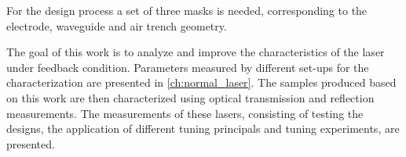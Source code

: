 
For the design process a set of three masks is needed, corresponding to the electrode, waveguide and air trench geometry.

The goal of this work is to analyze and improve the characteristics of the laser under feedback condition. Parameters measured by different set-ups for the characterization are presented in \autoref{ch:normal_laser}. The samples produced based on this work are then characterized using optical transmission and reflection measurements. The measurements of these lasers, consisting of testing the designs, the application of different tuning principals and tuning experiments, are presented.